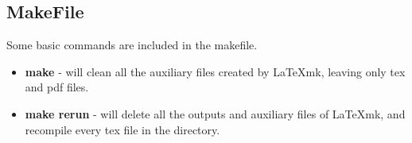 \documentclass[12pt]{article}
\begin{document}
    \subsection{MakeFile}

    Some basic commands are included in the makefile.

    \begin{itemize}
        \item \textbf{make} - will clean all the auxiliary files created by LaTeXmk, leaving only tex and pdf files.
        \item \textbf{make rerun} - will delete all the outputs and auxiliary files of LaTeXmk, and recompile every tex file in the directory.
    \end{itemize}
\end{document}
